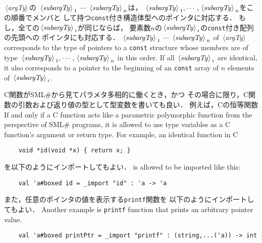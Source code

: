 \documentclass{jbook}
\newcommand{\smlsharp}{SML\#}
\newcommand{\nonterm}[1]{\mbox{$\,\langle$}{\it #1}\mbox{$\rangle\,$}}
\newcommand{\term}[1]{\mbox{{\tt #1}}}
\begin{document}
\ifjp%
	\nonterm{argTy}の
$\nonterm{subargTy}_1$ \term{*} $\cdots$ \term{*} $\nonterm{subargTy}_n$は，
$\nonterm{subargTy}_1, \cdots, \nonterm{subargTy}_n$をこの順番でメンバと
して持つ\term{const}付き構造体型へのポインタに対応する．
	もし，全ての$\nonterm{subargTy}_i$が同じならば，
要素数$n$の$\nonterm{subargTy}_i$の\term{const}付き配列の先頭への
ポインタにも対応する．
\else%
	$\nonterm{subargTy}_1$ \term{*} $\cdots$ \term{*} $\nonterm{subargTy}_n$
of \nonterm{argTy} corresponds to the type of
pointers to a \term{const} structure whose members are
of type $\nonterm{subargTy}_1, \cdots, \nonterm{subargTy}_n$
in this order.
	If all $\nonterm{subargTy}_i$ are identical,
it also corresponds to a pointer to the beginning of an \term{const}
array of $n$ elements of $\nonterm{subargTy}_i$.
\fi%

\ifjp%
	C関数が\smlsharp{}から見てパラメタ多相的に働くとき，かつ
その場合に限り，C関数の引数および返り値の型として型変数を書いても良い．
	例えば，Cの恒等関数
\else%
	If and only if a C function acts like a parametric polymorphic
function from the perspective of \smlsharp{} programs,
it is allowed to use type variables as a C function's argument or return
type.
	For example, an identical function in C
\fi%
\begin{verbatim}
    void *id(void *x) { return x; }
\end{verbatim}
\ifjp%
を以下のようにインポートしてもよい．
\else%
is allowed to be imported like this:
\fi%
\begin{verbatim}
    val 'a#boxed id = _import "id" : 'a -> 'a
\end{verbatim}
\ifjp%
	また，任意のポインタの値を表示する{\tt printf}関数を
以下のようにインポートしてもよい．
\else%
	Another example is {\tt printf} function that prints an arbitrary
pointer value.
\fi%
\begin{verbatim}
    val 'a#boxed printPtr = _import "printf" : (string,...('a)) -> int
\end{verbatim}
\end{document}
